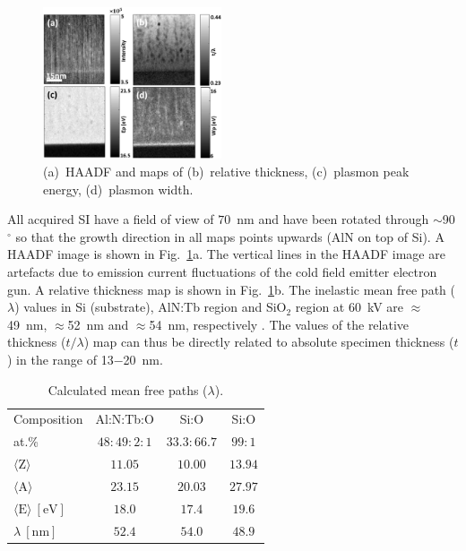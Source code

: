 \documentclass[%
aip,
rsi,%
 amsmath,amssymb,%
 reprint,%
]{revtex4-1}
\begin{document}
\begin{figure}
	\centering
    \includegraphics[width=0.47\textwidth]{combined_haadf}
    \caption{(a)~HAADF and maps of (b)~relative thickness, (c)~plasmon peak energy, (d)~plasmon width.}
    \label{fig:combined_haadf}
\end{figure}
All acquired SI have a field of view of $70$~nm and have been rotated through $\sim$90$^\circ$ so that the growth direction in all maps points upwards (AlN on top of Si). A HAADF image is shown in Fig.~\ref{fig:combined_haadf}a. The vertical lines in the HAADF image are artefacts due to emission current fluctuations of the cold field emitter electron gun. A relative thickness map is shown in Fig.~\ref{fig:combined_haadf}b. The inelastic mean free path ($\lambda$) values in Si (substrate), AlN:Tb region and SiO$_2$ region at 60~kV are $\approx$49~nm, $\approx$52~nm and $\approx$54~nm, respectively \cite{egerton2011}. The values of the relative thickness ($t/\lambda$) map can thus be directly related to absolute specimen thickness ($t$) in the range of 13$-$20~nm.
\begin{table}%
	\caption{Calculated mean free paths ($\lambda$).}
    \label{tab:lambda}
    \begin{ruledtabular}
    	\begin{tabular}{lccc}
        	Composition&Al:N:Tb:O&Si:O&Si:O												\\
            at.\%&$48:49:2:1$&$33.3:66.7$&$99:1$										\\ \hline
        	$\langle \text{Z} \rangle$&$11.05$&$10.00$&$13.94$							\\
            $\langle \text{A} \rangle$&$23.15$&$20.03$&$27.97$							\\
            $\langle \text{E} \rangle~\left[\text{eV}\right]$&$18.0$&$17.4$&$19.6$		\\
           	$\lambda~\left[\text{nm}\right]$&$52.4$&$54.0$&$48.9$
    	\end{tabular}
    \end{ruledtabular}
\end{table}
\end{document}
